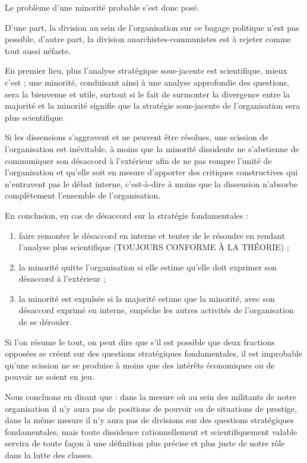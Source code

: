 Le problème d'une minorité probable s'est donc posé.

D'une part, la division au sein de l'organisation sur ce bagage politique n'est pas possible, d'autre part, la division anarchistes-communistes est à rejeter comme tout aussi néfaste.

En premier lieu, plus l'analyse stratégique sous-jacente est scientifique, mieux c'est ; une minorité, conduisant ainsi à une analyse approfondie des questions, sera la bienvenue et utile, surtout si le fait de surmonter la divergence entre la majorité et la minorité signifie que la stratégie sous-jacente de l'organisation sera plus scientifique.

Si les dissensions s'aggravent et ne peuvent être résolues, une scission de l'organisation est inévitable, à moins que la minorité dissidente ne s'abstienne de communiquer son désaccord à l'extérieur afin de ne pas rompre l'unité de l'organisation et qu'elle soit en mesure d'apporter des critiques constructives qui n'entravent pas le débat interne, c'est-à-dire à moins que la dissension n'absorbe complètement l'ensemble de l'organisation.

En conclusion, en cas de désaccord sur la stratégie fondamentales :

\begin{enumerate}
\item{} faire remonter le désaccord en interne et tenter de le résoudre en rendant l'analyse plus scientifique (TOUJOURS CONFORME À LA THÉORIE) ;
\item{} la minorité quitte l’organisation si elle estime qu'elle doit exprimer son désaccord à l'extérieur ;
\item{} la minorité est expulsée si la majorité estime que la minorité, avec son désaccord exprimé en interne, empêche les autres activités de l'organisation de se dérouler.
\end{enumerate}

Si l'on résume le tout, on peut dire que s'il est possible que deux fractions opposées se créent sur des questions stratégiques fondamentales, il est improbable qu'une scission ne se produise à moins que des intérêts économiques ou de pouvoir ne soient en jeu.

Nous concluons en disant que : dans la mesure où au sein des militants de notre organisation il n'y aura pas de positions de pouvoir ou de situations de prestige, dans la même mesure il n'y aura pas de divisions sur des questions stratégiques fondamentales, mais toute dissidence rationnellement et scientifiquement valable servira de toute façon à une définition plus précise et plus juste de notre rôle dans la lutte des classes.

